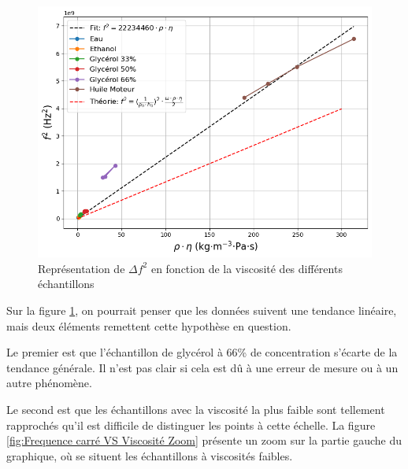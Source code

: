 \begin{figure}[H]
    \centering
    \includegraphics[width=\textwidth]{assets/figures/FrequVisc.png}
    \caption{Représentation de $\Delta f^2$ en fonction de la viscosité des différents échantillons}
    \label{fig:Frequence carré VS Viscosité}
\end{figure}

Sur la figure \ref{fig:Frequence carré VS Viscosité}, on pourrait penser que les données suivent une tendance linéaire, mais deux éléments remettent cette hypothèse en question.

Le premier est que l’échantillon de glycérol à 66\% de concentration s’écarte de la tendance générale.  
Il n’est pas clair si cela est dû à une erreur de mesure ou à un autre phénomène.

Le second est que les échantillons avec la viscosité la plus faible sont tellement rapprochés qu’il est difficile de distinguer les points à cette échelle.  
La figure \ref{fig:Frequence carré VS Viscosité Zoom} présente un zoom sur la partie gauche du graphique, où se situent les échantillons à viscosités faibles.

